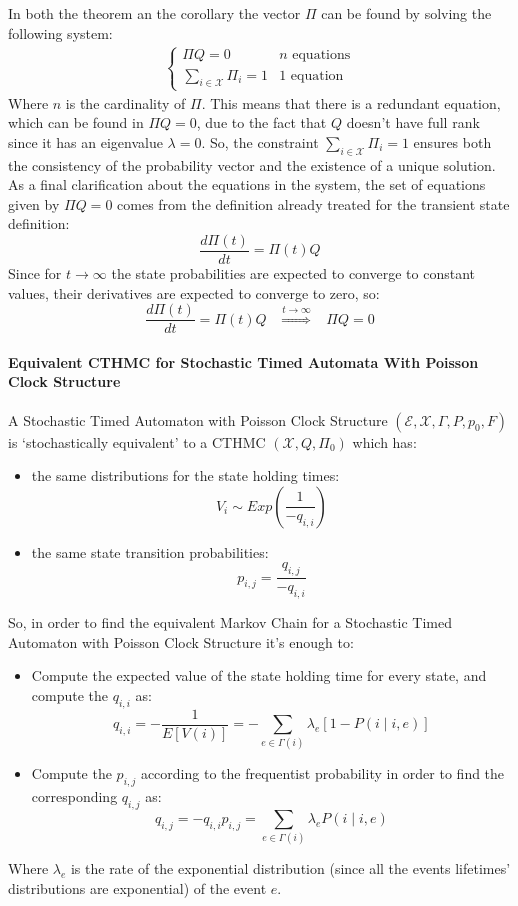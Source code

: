\documentclass[12pt,a4paper]{article}
\begin{document}
\bigskip
\noindent
In both the theorem an the corollary the vector $\Pi$ can be found by solving the following system:
$$
\begin{matrix}
\begin{cases}
\Pi Q=0 & n \textrm{ equations}\\
\underset{i\in\mathcal{X}}{\sum{}}{\Pi_i=1} & 1 \textrm{ equation}
\end{cases}
\end{matrix}
$$
Where $n$ is the cardinality of $\Pi$. This means that there is a redundant equation, which can be found in $\Pi Q=0$, due to the fact that $Q$ doesn't have full rank since it has an eigenvalue $\lambda =0$. So, the constraint $\sum_{i\in\mathcal{X}}{\Pi_i=1}$ ensures both the consistency of the probability vector and the existence of a unique solution.
As a final clarification about the equations in the system, the set of equations given by $\Pi Q=0$ comes from the definition already treated for the transient state definition:
$$
\frac{d\Pi(t)}{dt}=\Pi(t)Q
$$ 
Since for $t\rightarrow\infty$ the state probabilities are expected to converge to constant values, their derivatives are expected to converge to zero, so:
$$
\frac{d\Pi(t)}{dt}=\Pi(t)Q \hspace{10pt} \overset{t\rightarrow\infty}{\Rightarrow}\hspace{10pt} \Pi Q=0
$$
\newpage
\paragraph{Equivalent CTHMC for Stochastic Timed Automata With Poisson Clock Structure}

\noindent A Stochastic Timed Automaton with Poisson Clock Structure $(\mathcal{E},\mathcal{X},\Gamma,P,p_0,F)$
is `stochastically equivalent' to a CTHMC $(\mathcal{X},Q,\Pi_0)$ which has:
\begin{itemize}
\item the same distributions for the state holding times:
$$
V_i \sim Exp\left(\frac{1}{-q_{i,i}}\right)
$$
\item the same state transition probabilities:
$$
p_{i,j}=\frac{q_{i,j}}{-q_{i,i}}
$$
\end{itemize}  
So, in order to find the equivalent Markov Chain for a Stochastic Timed Automaton with Poisson Clock Structure it's enough to:
\begin{itemize}
\item Compute the expected value of the state holding time for every state, and compute the $q_{i,i}$ as:
$$
q_{i,i}=-\frac{1}{E[V(i)]}=-\sum_{e\in\Gamma(i)}{\lambda_e\left[1-P(i \mid i,e)\right]}
$$
\item Compute the $p_{i,j}$ according to the frequentist probability in order to find the corresponding $q_{i,j}$ as:
$$
q_{i,j}=-q_{i,i}p_{i,j}=\sum_{e\in\Gamma(i)}{\lambda_e P(i \mid i,e)}
$$
\end{itemize}
Where $\lambda_e$ is the rate of the exponential distribution (since all the events lifetimes' distributions are exponential) of the event $e$.
\newpage
\end{document}
